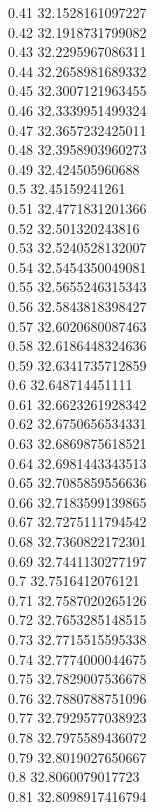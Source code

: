{0.41	32.1528161097227\\
0.42	32.1918731799082\\
0.43	32.2295967086311\\
0.44	32.2658981689332\\
0.45	32.3007121963455\\
0.46	32.3339951499324\\
0.47	32.3657232425011\\
0.48	32.3958903960273\\
0.49	32.424505960688\\
0.5	32.45159241261\\
0.51	32.4771831201366\\
0.52	32.501320243816\\
0.53	32.5240528132007\\
0.54	32.5454350049081\\
0.55	32.5655246315343\\
0.56	32.5843818398427\\
0.57	32.6020680087463\\
0.58	32.6186448324636\\
0.59	32.6341735712859\\
0.6	32.648714451111\\
0.61	32.6623261928342\\
0.62	32.6750656534331\\
0.63	32.6869875618521\\
0.64	32.6981443343513\\
0.65	32.7085859556636\\
0.66	32.7183599139865\\
0.67	32.7275111794542\\
0.68	32.7360822172301\\
0.69	32.7441130277197\\
0.7	32.7516412076121\\
0.71	32.7587020265126\\
0.72	32.7653285148515\\
0.73	32.7715515595338\\
0.74	32.7774000044675\\
0.75	32.7829007536678\\
0.76	32.7880788751096\\
0.77	32.7929577038923\\
0.78	32.7975589436072\\
0.79	32.8019027650667\\
0.8	32.8060079017723\\
0.81	32.8098917416794\\
}
